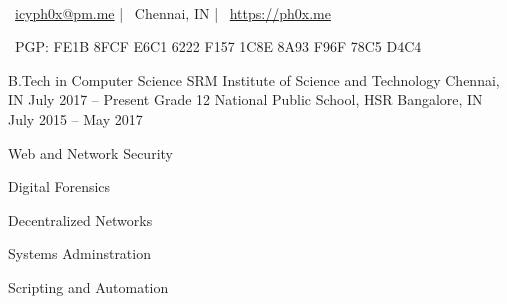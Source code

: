 \documentclass[]{awesome-cv}
\begin{document}
    
\begin{center}
	  \\
	\vspace{2mm}
	{\faEnvelope\ \href{mailto:icyph0x@pm.me}{icyph0x@pm.me}} | {\faMapMarker\ Chennai, IN} | {\faLink\ \url{https://ph0x.me}}
	\begin{center}
		{\faKey\ PGP: FE1B 8FCF E6C1 6222 F157 1C8E 8A93 F96F 78C5 D4C4}
	\end{center} 
\end{center} 
\begin{cventries}
	\cventry
	{B.Tech in Computer Science}
	{SRM Institute of Science and Technology}
	{Chennai, IN}
	{July 2017 – Present}
	{}
	\cventry
	{Grade 12}
	{National Public School, HSR}
	{Bangalore, IN}
	{July 2015 – May 2017}
	{}
\end{cventries}

\vspace{-6mm}
\vspace{3mm}
	{\begin{cvitems}
		\item {Web and Network Security}
		\item {Digital Forensics}
		\item {Decentralized Networks}
		\item {Systems Adminstration}
		\item {Scripting and Automation}
	\end{cvitems}}
\end{document}
